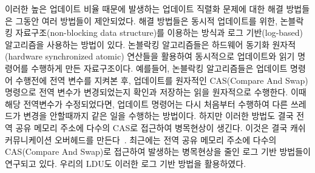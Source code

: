 이러한 높은 업데이트 비율 때문에 발생하는 업데이트 직렬화 문제에 대한 해결 방법들은
그동안 여러 방법들이 제안되었다. 
해결 방법들은 동시적 업데이트를 위한, 논블락킹 자료구조(non-blocking data structure)를 이용하는 
방식과 로그 기반(log-based) 알고리즘을 사용하는 방법이 있다.
논블락킹 알고리즘들은 하드웨어 동기화 원자적(hardware synchronized atomic) 연산들을 활용하여
동시적으로 업데이트와 읽기 명령어를 수행하게 만든 자료구조이다.
예를들어, 논블락킹 알고리즘들은 업데이트 명령어 수행전에 전역 변수를 지켜본 후, 업데이트를 
원자적인 CAS(Compare And Swap) 명령으로 전역 변수가 변경되었는지 확인과 저장하는 읽을 원자적으로 
수행한다. 
이때 해당 전역변수가 수정되었다면, 업데이트 명령어는 다시 처음부터 수행하여 다른 쓰레드가 변경을 
안할때까지 같은 일을 수행하는 방법이다.  
하지만 이러한 방법도 결국 전역 공유 메모리 주소에 다수의 CAS로 접근하여
병목현상이 생긴다. 이것은 결국 캐쉬 커뮤니케이션 오버헤드를 만든다~\cite{SilasBoydWickizerPth}.
최근에는 전역 공유 메모리 주소에 다수의 CAS(Compare And Swap)로 접근하여
발생하는 병목현상을 줄인 로그 기반 방법들이 연구되고 있다.
우리의 LDU도 이러한 로그 기반 방법을 활용하였다.



